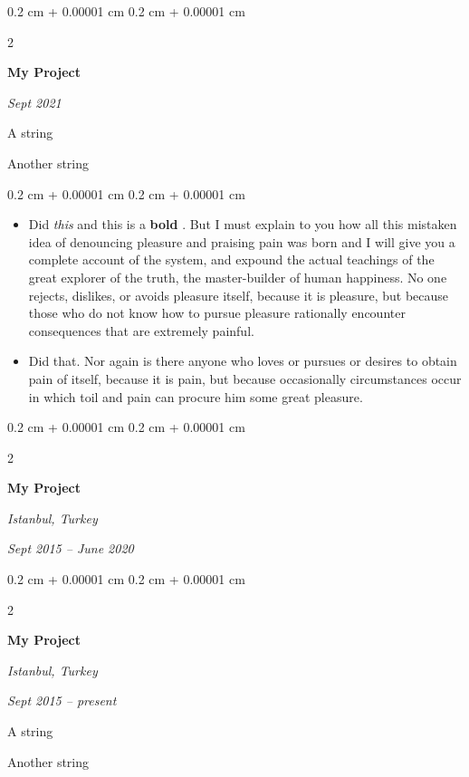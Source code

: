 \documentclass[10pt, letterpaper]{article}
\newenvironment{summary}{
    \begin{description}[
        topsep=0.10 cm,
        parsep=0.10 cm,
        partopsep=0pt,
        itemsep=0pt,
        leftmargin=0.4 cm + 10pt
    ]
}{
    \end{description}
} %
\newenvironment{highlights}{
    \begin{itemize}[
        topsep=0.10 cm,
        parsep=0.10 cm,
        partopsep=0pt,
        itemsep=0pt,
        leftmargin=0.4 cm + 10pt
    ]
}{
    \end{itemize}
} %
\newenvironment{onecolentry}{
    \begin{adjustwidth}{
        0.2 cm + 0.00001 cm
    }{
        0.2 cm + 0.00001 cm
    }
}{
    \end{adjustwidth}
} %
\newenvironment{twocolentry}[2][]{
    \onecolentry
    \def\secondColumn{#2}
    \setcolumnwidth{\fill, 4.5 cm}
    \begin{paracol}{2}
}{
    \switchcolumn \raggedleft \secondColumn
    \end{paracol}
    \endonecolentry
} %
\let\hrefWithoutArrow\href
\renewcommand{\href}[2]{\hrefWithoutArrow{#1}{\ifthenelse{\equal{#2}{}}{ }{#2 }\raisebox{.15ex}{\footnotesize \faExternalLink*}}}
\begin{document}
        \begin{twocolentry}{
            
            
        \textit{Sept 2021}}
            \textbf{My Project}
        \end{twocolentry}
            \begin{summary}
                \item A string
                \item Another string
            \end{summary}
        \vspace{0.10 cm}
        \begin{onecolentry}
            \begin{highlights}
                \item Did \textit{this} and this is a \textbf{bold} \href{https://example.com}{link}. But I must explain to you how all this mistaken idea of denouncing pleasure and praising pain was born and I will give you a complete account of the system, and expound the actual teachings of the great explorer of the truth, the master-builder of human happiness. No one rejects, dislikes, or avoids pleasure itself, because it is pleasure, but because those who do not know how to pursue pleasure rationally encounter consequences that are extremely painful.
                \item Did that. Nor again is there anyone who loves or pursues or desires to obtain pain of itself, because it is pain, but because occasionally circumstances occur in which toil and pain can procure him some great pleasure.
            \end{highlights}
        \end{onecolentry}


        \vspace{0.2 cm}

        \begin{twocolentry}{
        \textit{Istanbul, Turkey}    
            
        \textit{Sept 2015 – June 2020}}
            \textbf{My Project}
        \end{twocolentry}


        \vspace{0.2 cm}

        \begin{twocolentry}{
        \textit{Istanbul, Turkey}    
            
        \textit{Sept 2015 – present}}
            \textbf{My Project}
        \end{twocolentry}
            \begin{summary}
                \item A string
                \item Another string
            \end{summary}
\end{document}
